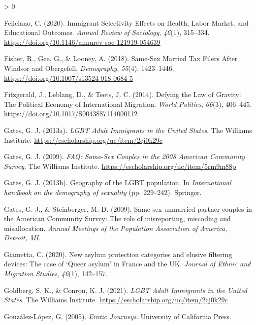 \documentclass[
  11pt,
]{article}
\newlength{\cslhangindent}
\newenvironment{CSLReferences}[2] %
 {%
  \setlength{\parindent}{0pt}
  \ifodd #1 \everypar{\setlength{\hangindent}{\cslhangindent}}\ignorespaces\fi
  \ifnum #2 > 0
  \setlength{\parskip}{#2\baselineskip}
  \fi
 }%
 {}
\begin{document}
\begin{CSLReferences}{1}{0}
\leavevmode\hypertarget{ref-feliciano_2020}{}%
Feliciano, C. (2020). Immigrant {Selectivity} {Effects} on {Health}, {Labor} {Market}, and {Educational} {Outcomes}. \emph{Annual Review of Sociology}, \emph{46}(1), 315--334. \url{https://doi.org/10.1146/annurev-soc-121919-054639}

\leavevmode\hypertarget{ref-fisher_2018}{}%
Fisher, R., Gee, G., \& Looney, A. (2018). Same-{Sex} {Married} {Tax} {Filers} {After} {Windsor} and {Obergefell}. \emph{Demography}, \emph{55}(4), 1423--1446. \url{https://doi.org/10.1007/s13524-018-0684-5}

\leavevmode\hypertarget{ref-fitzgerald_2014}{}%
Fitzgerald, J., Leblang, D., \& Teets, J. C. (2014). Defying the {Law} of {Gravity}: {The} {Political} {Economy} of {International} {Migration}. \emph{World Politics}, \emph{66}(3), 406--445. \url{https://doi.org/10.1017/S0043887114000112}

\leavevmode\hypertarget{ref-gates_2013}{}%
Gates, G. J. (2013a). \emph{{LGBT} {Adult} {Immigrants} in the {United} {States}}. The Williams Institute. \url{https://escholarship.org/uc/item/2cj0k29c}

\leavevmode\hypertarget{ref-gates_2009a}{}%
Gates, G. J. (2009). \emph{{FAQ}: {Same}-{Sex} {Couples} in the 2008 {American} {Community} {Survey}}. The Williams Institute. \url{https://escholarship.org/uc/item/5rm9m88p}

\leavevmode\hypertarget{ref-gates_2013a}{}%
Gates, G. J. (2013b). Geography of the {LGBT} population. In \emph{International handbook on the demography of sexuality} (pp. 229--242). Springer.

\leavevmode\hypertarget{ref-gates_2009}{}%
Gates, G. J., \& Steinberger, M. D. (2009). Same-sex unmarried partner couples in the {American} {Community} {Survey}: {The} role of misreporting, miscoding and misallocation. \emph{Annual Meetings of the Population Association of America, Detroit, {MI}}.

\leavevmode\hypertarget{ref-giametta_2020}{}%
Giametta, C. (2020). New asylum protection categories and elusive filtering devices: The case of {`{Queer} asylum'} in {France} and the {UK}. \emph{Journal of Ethnic and Migration Studies}, \emph{46}(1), 142--157.

\leavevmode\hypertarget{ref-goldberg_2021}{}%
Goldberg, S. K., \& Conron, K. J. (2021). \emph{{LGBT} {Adult} {Immigrants} in the {United} {States}}. The Williams Institute. \url{https://escholarship.org/uc/item/2cj0k29c}

\leavevmode\hypertarget{ref-gonzalez-lopez_2005}{}%
González-López, G. (2005). \emph{Erotic {Journeys}}. University of California Press.


\end{CSLReferences}
\end{document}
